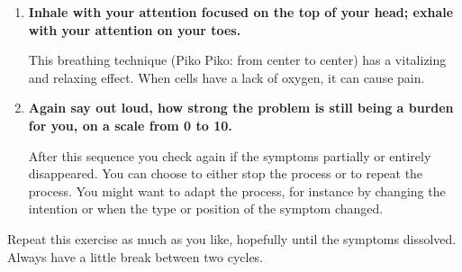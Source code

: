 \documentclass[../main.tex]{subfiles}
\begin{document}
{\begin{enumerate}
The choice of the point to touch is not random
\begin{itemize}
\item Touching the region around the thymus gland below the breast bone (sternum)
  can appease anxiety and fears (``My chest is constricted'').
  This in turn relaxes the chest  and lung muscles  and stimulate the immune system .
  During stress, the thymus gland contracts and blocks the transport of leukocytes (white blood cells).
\item At the hands, meridian points, which can appease head aches  and which are said to
  revitalize the whole body.
\item The slightly protruding bone above the first thoracic vertebra is said to have a relaxing effect on the whole upper body,
  the spine and the hip region.
\end{itemize}

Find out for yourself, if tapping seven times is the right type of touch for you.
Maybe a slight vibration or a longer touch (without pressure) or a longer touch with humming (relaxes the bones and stimulates the circulation!)
 corresponds better to you.
\item \textbf{Inhale with your attention focused on the top of your head; exhale with your
    attention on your toes.}

  This breathing technique (Piko Piko: from center to center) has a vitalizing and relaxing effect. 
  When cells have a lack of oxygen, it can cause pain.
\item \textbf{Again say out loud, how strong the problem is still being a burden for you, on a scale from 0 to 10.}

  After this sequence you check again if the symptoms partially or entirely disappeared. You can choose to either stop the process or to repeat the process.
  You might want to adapt the process, for instance by changing the intention or when the type or position of the symptom changed.
\end{enumerate}
}

Repeat this exercise as much as you like, hopefully until the symptoms dissolved.
Always have a little break between two cycles.
\end{document}
